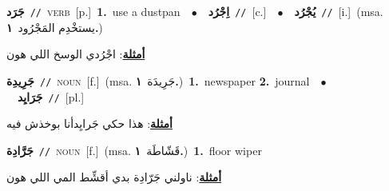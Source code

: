 \documentclass[10pt,a4paper,twoside]{article} %
\begin{document}
\begin{multicols}{2}
{\setlength\topsep{0pt}\textbf{\foreignlanguage{arabic}{جَرَد}}\ {\color{gray}\texttt{//}\color{black}}\ \textsc{verb}\ [p.]\ \textbf{1.}~use a dustpan\ \ $\bullet$\ \ \setlength\topsep{0pt}\textbf{\foreignlanguage{arabic}{اِجْرُد}}\ {\color{gray}\texttt{//}\color{black}}\ [c.]\ \ $\bullet$\ \ \setlength\topsep{0pt}\textbf{\foreignlanguage{arabic}{يُجْرُد}}\ {\color{gray}\texttt{//}\color{black}}\ [i.]\ \color{gray}(msa. \foreignlanguage{arabic}{يستخْدِم المَجْرُود}~\foreignlanguage{arabic}{\textbf{١.}})\color{black}\  \begin{flushright}\color{gray}\foreignlanguage{arabic}{\textbf{\underline{\foreignlanguage{arabic}{أمثلة}}}: اجْرُدي الوسخ اللي هون}\end{flushright}\color{black}} \vspace{2mm}

{\setlength\topsep{0pt}\textbf{\foreignlanguage{arabic}{جَرِيدِة}}\ {\color{gray}\texttt{//}\color{black}}\ \textsc{noun}\ [f.]\ \color{gray}(msa. \foreignlanguage{arabic}{جَرِيدَة}~\foreignlanguage{arabic}{\textbf{١.}})\color{black}\ \textbf{1.}~newspaper  \textbf{2.}~journal\ \ $\bullet$\ \ \setlength\topsep{0pt}\textbf{\foreignlanguage{arabic}{جَرَايِد}}\ {\color{gray}\texttt{//}\color{black}}\ [pl.]\  \begin{flushright}\color{gray}\foreignlanguage{arabic}{\textbf{\underline{\foreignlanguage{arabic}{أمثلة}}}: هذا حكي جَرايِدأنا بوخذش فيه}\end{flushright}\color{black}} \vspace{2mm}

{\setlength\topsep{0pt}\textbf{\foreignlanguage{arabic}{جَرَّادِة}}\ {\color{gray}\texttt{//}\color{black}}\ \textsc{noun}\ [f.]\ \color{gray}(msa. \foreignlanguage{arabic}{قَشّاطَة}~\foreignlanguage{arabic}{\textbf{١.}})\color{black}\ \textbf{1.}~floor wiper\  \begin{flushright}\color{gray}\foreignlanguage{arabic}{\textbf{\underline{\foreignlanguage{arabic}{أمثلة}}}: ناولني جَرّادِة بدي أقشِّط المي اللي هون}\end{flushright}\color{black}} \vspace{2mm}


\end{multicols}
\end{document}
